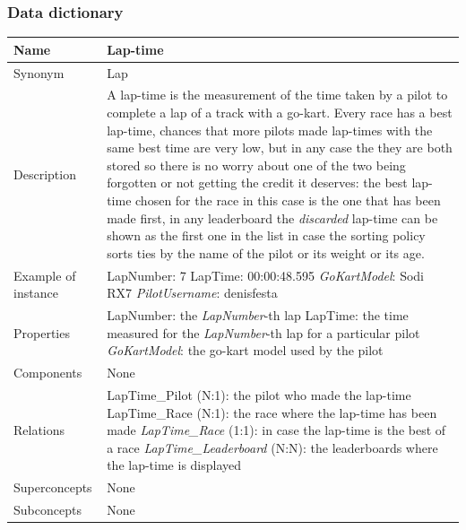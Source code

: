\documentclass{beamer}
\begin{document}
\begin{frame}
\frametitle{Data dictionary}
\begin{table}
\tiny
\begin{tabular}{|p{2cm}|p{6cm}|}
\hline
Name & \textbf{Lap-time} \\
\hline
Synonym & Lap \\
\hline
Description & A lap-time is the measurement 
of the time taken by a pilot to complete a lap 
of a track with a go-kart. 
Every race has a best lap-time,
chances that more pilots made lap-times with the same
best time are very low, but in any case the they are both stored
so there is no worry about one of the two being forgotten or not
getting the credit it deserves:
the best lap-time chosen for the race in this case is the one 
that has been made first, in any leaderboard the \textit{discarded}
lap-time can be shown as the first one in the list in case the sorting
policy sorts ties by the name of the pilot or its weight or its age. \\
\hline
Example of instance &
LapNumber: 7 \newline
LapTime: 00:00:48.595 \newline
\textit{GoKartModel}: Sodi RX7 \newline
\textit{PilotUsername}: denisfesta \\
\hline
Properties &
LapNumber: the \textit{LapNumber}-th lap \newline
LapTime: the time measured for the \textit{LapNumber}-th lap for 
a particular pilot \newline
\textit{GoKartModel}: the go-kart model used by the pilot \\
\hline
Components & None \\
\hline
Relations & 
LapTime\_Pilot (N:1): the pilot who made the lap-time \newline
LapTime\_Race (N:1): the race where the lap-time has been made \newline
\textit{LapTime\_Race} (1:1): in case the lap-time is the best of a race \newline
\textit{LapTime\_Leaderboard} (N:N): the leaderboards where the lap-time is displayed \\
\hline
Superconcepts & None \\
\hline
Subconcepts & None \\
\hline
\end{tabular}
\end{table}
\end{frame}
\end{document}
